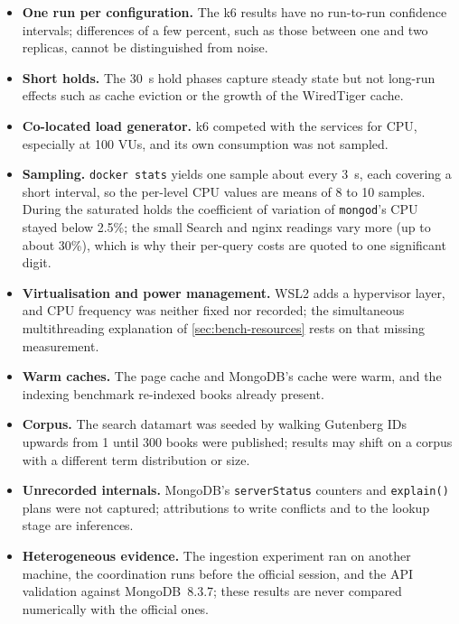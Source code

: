 \documentclass[10pt,a4paper]{article}
\newcommand{\code}[1]{\texttt{#1}}
\begin{document}
\begin{itemize}
  \item \textbf{One run per configuration.} The k6 results have no
  run-to-run confidence intervals; differences of a few percent, such as those
  between one and two replicas, cannot be distinguished from noise.
  \item \textbf{Short holds.} The 30~s hold phases capture steady state but
  not long-run effects such as cache eviction or the growth of the WiredTiger
  cache.
  \item \textbf{Co-located load generator.} k6 competed with the services for
  CPU, especially at 100 VUs, and its own consumption was not sampled.
  \item \textbf{Sampling.} \code{docker stats} yields one sample about every
  3~s, each covering a short interval, so the per-level CPU values are means
  of 8 to 10 samples. During the saturated holds the coefficient of variation
  of \code{mongod}'s CPU stayed below 2.5\%; the small Search and nginx
  readings vary more (up to about 30\%), which is why their per-query costs are
  quoted to one significant digit.
  \item \textbf{Virtualisation and power management.} WSL2 adds a hypervisor
  layer, and CPU frequency was neither fixed nor recorded; the simultaneous
  multithreading explanation of \cref{sec:bench-resources} rests on that
  missing measurement.
  \item \textbf{Warm caches.} The page cache and MongoDB's cache were warm,
  and the indexing benchmark re-indexed books already present.
  \item \textbf{Corpus.} The search datamart was seeded by walking Gutenberg
  IDs upwards from 1 until 300 books were published; results may shift on a
  corpus with a different term distribution or size.
  \item \textbf{Unrecorded internals.} MongoDB's \code{serverStatus} counters
  and \code{explain()} plans were not captured; attributions to write conflicts
  and to the lookup stage are inferences.
  \item \textbf{Heterogeneous evidence.} The ingestion experiment ran on
  another machine, the coordination runs before the official session, and the
  API validation against MongoDB~8.3.7; these results are never compared
  numerically with the official ones.
\end{itemize}

\end{document}
